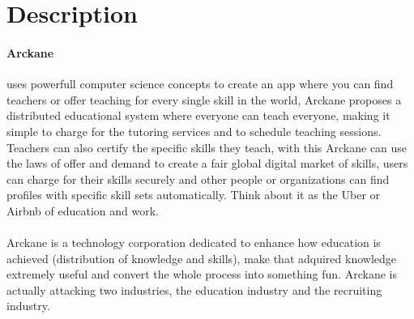 \section{Description}\label{description}

\paragraph{Arckane} uses powerfull computer science concepts to create an app where you can find teachers or offer teaching for every single skill in the world, Arckane proposes a distributed educational system where everyone can teach everyone, making it simple to charge for the tutoring services and to schedule teaching sessions. Teachers can also certify the specific skills they teach, with this Arckane can use the laws of offer and demand to create a fair global digital market of skills, users can charge for their skills securely and other people or organizations can find profiles with specific skill sets automatically. Think about it as the Uber or Airbnb of education and work.

\paragraph{} Arckane is a technology corporation dedicated to enhance how education is achieved (distribution of knowledge and skills), make that adquired knowledge extremely useful and convert the whole process into something fun. Arckane is actually attacking two industries, the education industry and the recruiting industry.

